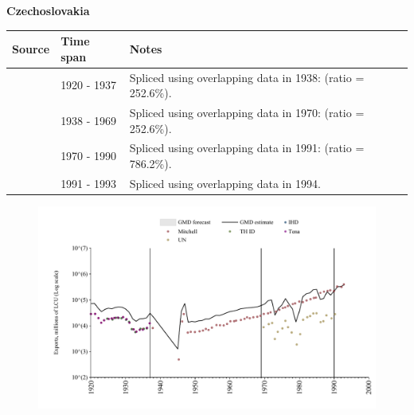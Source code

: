 \documentclass[12pt,a4paper,landscape]{article}
\begin{document}
\begin{adjustbox}{max totalsize={\paperwidth}{\paperheight},center}
\begin{minipage}[t][\textheight][t]{\textwidth}
\vspace*{0.5cm}
{}
\begin{center}
{\Large\bfseries Czechoslovakia}
\end{center}
\vspace{0.5cm}
\begin{table}[H]
\centering
\small
\begin{tabular}{|l|l|l|}
\hline
\textbf{Source} & \textbf{Time span} & \textbf{Notes} \\
\hline
\rowcolor{white}\cite{Tena}& 1920 - 1937 &Spliced using overlapping data in 1938: (ratio = 252.6\%).\\
\rowcolor{lightgray}\cite{Mitchell}& 1938 - 1969 &Spliced using overlapping data in 1970: (ratio = 252.6\%).\\
\rowcolor{white}\cite{UN}& 1970 - 1990 &Spliced using overlapping data in 1991: (ratio = 786.2\%).\\
\rowcolor{lightgray}\cite{Mitchell}& 1991 - 1993 &Spliced using overlapping data in 1994.\\
\hline
\end{tabular}
\end{table}
\begin{figure}[H]
\centering
\includegraphics[width=\textwidth,height=0.6\textheight,keepaspectratio]{graphs/CSK_exports.pdf}
\end{figure}
\end{minipage}
\end{adjustbox}
\end{document}
